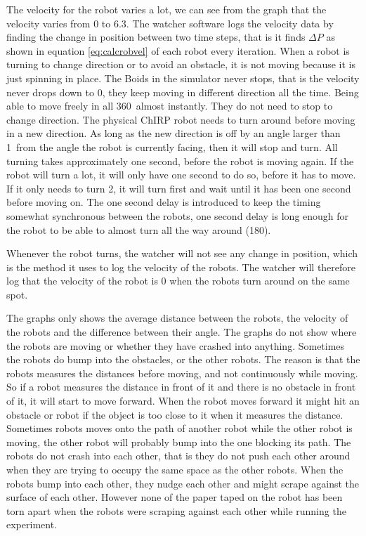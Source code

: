 The velocity for the robot varies a lot, we can see from the graph that the velocity varies from 0 to 6.3. The watcher software logs the velocity data by finding the change in position between two time steps, that is it finds $\Delta P$ as shown in equation \ref{eq:calcrobvel} of each robot every iteration. When a robot is turning to change direction or to avoid an obstacle, it is not moving because it is just spinning in place. 
The Boids in the simulator never stops, that is the velocity never drops down to 0, they keep moving in different direction all the time. Being able to move freely in all 360\textdegree\ almost instantly. They do not need to stop to change direction.
The physical ChIRP robot needs to turn around before moving in a new direction. As long as the new direction is off by an angle larger than 1\textdegree\ from the angle the robot is currently facing, then it will stop and turn. All turning takes approximately one second, before the robot is moving again. If the robot will turn a lot, it will only have one second to do so, before it has to move. If it only needs to turn 2\textdegree, it will turn first and wait until it has been one second before moving on.
The one second delay is introduced to keep the timing somewhat synchronous between the robots, one second delay is long enough for the robot to be able to almost turn all the way around (180\textdegree). 

Whenever the robot turns, the watcher will not see any change in position, which is the method it uses to log the velocity of the robots. The watcher will therefore log that the velocity of the robot is 0 when the robots turn around on the same spot. 

The graphs only shows the average distance between the robots, the velocity of the robots and the difference between their angle. The graphs do not show where the robots are moving or whether they have crashed into anything.
Sometimes the robots do bump into the obstacles, or the other robots. The reason is that the robots measures the distances before moving, and not continuously while moving. So if a robot measures the distance in front of it and there is no obstacle in front of it, it will start to move forward. When the robot moves forward it might hit an obstacle or robot if the object is too close to it when it measures the distance. Sometimes robots moves onto the path of another robot while the other robot is moving, the other robot will probably bump into the one blocking its path. The robots do not crash into each other, that is they do not push each other around when they are trying to occupy the same space as the other robots. When the robots bump into each other, they nudge each other and might scrape against the surface of each other. However none of the paper taped on the robot has been torn apart when the robots were scraping against each other while running the experiment.

